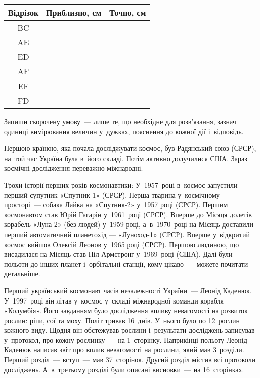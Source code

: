 \begin{center}
  \sffamily
  \begin{tabular}{|c|c|c|}
    \hline
    Відрізок & Приблизно, см & Точно, см \\ \hline
    BC & & \\ \hline
    AE & & \\ \hline
    ED & & \\ \hline
    AF & & \\ \hline
    EF & & \\ \hline
    FD & & \\ \hline
  \end{tabular}
\end{center}


\problem
Запиши скорочену умову~--- лише те, що необхідне для розв’язання,
зазнач одиниці вимірювання величин у~дужках, пояснення до кожної дії
і~відповідь.

Першою країною, яка почала досліджувати космос, був Радянський союз (СРСР),
на~той час Україна була в~його складі. Потім активно долучилися США.
Зараз космічні дослідження переважно міжнародні.

Трохи історії перших років космонавтики:
У~1957~році в~космос запустили перший супутник «Спутник-1» (СРСР).
Перша тварина у~космічному просторі~--- собака Лайка на «Спутник-2»
у~1957 році (СРСР).
Першим космонавтом став Юрій Гагарін у~1961~році (СРСР).
Вперше до Місяця долетів корабель «Луна-2» (без людей) у~1959 році,
а~в~1970~році на Місяць доставили перший автоматичний планетохід —
«Луноход-1» (СРСР).
Вперше у~відкритий космос вийшов Олексій Леонов у~1965 році (СРСР).
Першою людиною, що висадилася на Місяць став Ніл Армстронг у~1969~році (США).
Далі були польоти до інших планет і~орбітальні станції,
кому цікаво~--- можете почитати детальніше.

Перший український космонавт часів незалежності України~--- Леонід Каденюк.
У~1997~році він літав у~космос у~складі міжнародної команди корабля «Колумбія».
Його завданням було дослідження впливу невагомості на розвиток рослин:
ріпи, сої та моху. Політ тривав 16~днів. У~нього було по 12~рослин кожного виду.
Щодня він обстежував рослини і~результати досліджень записував у~протокол,
про кожну рослинку~--- на 1~сторінку. Наприкінці польоту Леонід Каденюк
написав звіт про вплив невагомості на рослини, який мав 3~розділи.
Перший розділ~--- вступ~--- мав 37~сторінок. Другий розділ містив всі
протоколи досліджень. А~в~третьому розділі були описані висновки~---
на 16~сторінках.


